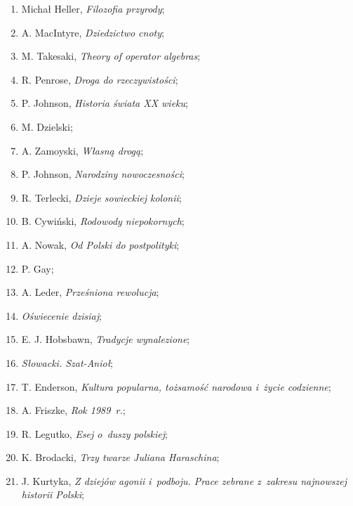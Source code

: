 \documentclass[a4paper,11pt]{article}
\begin{document}
\begin{enumerate}
\item Michał Heller, \textit{Filozofia przyrody};

\item A. MacIntyre, \textit{Dziedzictwo cnoty};

\item M. Takesaki, \textit{Theory of operator algebras};

\item R. Penrose, \textit{Droga do rzeczywistości};

\item P. Johnson, \textit{Historia świata XX wieku};

\item M. Dzielski;

\item A. Zamoyski, \textit{Własną drogą};

\item P. Johnson, \textit{Narodziny nowoczesności};

\item R. Terlecki, \textit{Dzieje sowieckiej kolonii};

\item B. Cywiński, \textit{Rodowody niepokornych};

\item A. Nowak, \textit{Od Polski do postpolityki};

\item P. Gay;

\item A. Leder, \textit{Prześniona rewolucja};

\item \textit{Oświecenie dzisiaj};

\item E. J. Hobsbawn, \textit{Tradycje wynalezione};

\item \textit{Słowacki. Szat-Anioł};

\item T. Enderson, \textit{Kultura popularna, tożsamość narodowa i~życie
    codzienne};

\item A. Friszke, \textit{Rok 1989~r.};

\item R. Legutko, \textit{Esej o~duszy polskiej};

\item K. Brodacki, \textit{Trzy twarze Juliana Haraschina};

\item J. Kurtyka, \textit{Z dziejów agonii i~podboju. Prace zebrane
    z~zakresu najnowszej historii Polski};


\end{enumerate}
\end{document}
